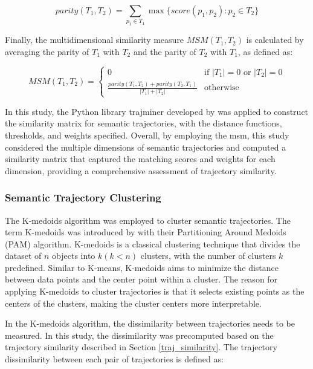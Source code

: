 \documentclass{article}
\theoremstyle{remark}
\begin{document}
\begin{equation} \label{eq:parity}
    parity(T_{1},T_{2}) = \sum_{p_{1}\in T_{1}}\max\{score(p_{1},p_{2}) : p_{2} \in T_{2}\}
\end{equation}

Finally, the multidimensional similarity measure $MSM(T_{1},T_{2})$ is calculated by averaging the parity of $T_{1}$ with $T_{2}$ and the parity of $T_{2}$ with $T_{1}$, as defined as:

\begin{equation} \label{eq:msm}
    MSM(T_{1},T_{2}) = \begin{cases}
    0 & \text{if } |T_{1}| = 0 \text{ or } |T_{2}| = 0 \\
    \frac{parity(T_{1},T_{2}) + parity(T_{2},T_{1})}{|T_{1}|+|T_{2}|} & \text{otherwise}
    \end{cases}
\end{equation}

In this study, the Python library trajminer developed by \cite{petry_trajminer_2019} was applied to construct the similarity matrix for semantic trajectories, with the distance functions, thresholds, and weights specified. Overall, by employing the \acrshort{msm}, this study considered the multiple dimensions of semantic trajectories and computed a similarity matrix that captured the matching scores and weights for each dimension, providing a comprehensive assessment of trajectory similarity.


\subsubsection{Semantic Trajectory Clustering}
The K-medoids algorithm was employed to cluster semantic trajectories. The term K-medoids was introduced by \cite{kaufman_partitioning_1990} with their Partitioning Around Medoids (PAM) algorithm. K-medoids is a classical clustering technique that divides the dataset of $n$ objects into $k (k<n)$ clusters, with the number of clusters $k$ predefined. Similar to K-means, K-medoids aims to minimize the distance between data points and the center point within a cluster. The reason for applying K-medoids to cluster trajectories is that it selects existing points as the centers of the clusters, making the cluster centers more interpretable.

In the K-medoids algorithm, the dissimilarity between trajectories needs to be measured. In this study, the dissimilarity was precomputed based on the trajectory similarity described in Section \ref{traj_similarity}. The trajectory dissimilarity between each pair of trajectories is defined as:
\end{document}
